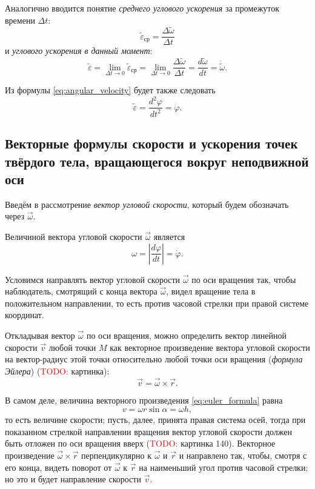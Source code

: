 \documentclass{article}
\theoremstyle{definition}
\theoremstyle{plain}
\theoremstyle{remark}
\numberwithin{equation}{section}
\newcommand{\abs}[1]{\left|#1\right|}
\newcommand{\crossprod}[2]{#1 \times #2}
\newcommand{\der}[2][]{\frac{d #1}{d #2}}
\newcommand{\sder}[2][]{\frac{d^2 #1}{d #2^2}}
\newcommand{\deltader}[2]{\frac{\Delta #1}{\Delta #2}}
\newcommand{\dt}[1][]{\der[#1]{t}}
\newcommand{\ddt}[1][]{\sder[#1]{t}}
\begin{document}
Аналогично вводится понятие \textit{среднего углового ускорения} за промежуток
времени $\Delta t$:
\begin{equation*}
  \tilde{\varepsilon}_{\text{ср}} = \deltader{\tilde{\omega}}{t}
\end{equation*}
и \textit{углового ускорения в данный момент}:
\begin{equation}
  \label{eq:angular_acceleration}
  \tilde{\varepsilon} = \lim_{\Delta t \to 0} \tilde{\varepsilon}_{\text{ср}} =
    \lim_{\Delta t \to 0} \deltader{\tilde{\omega}}{t} = \dt[\tilde{\omega}] =
    \dot{\tilde{\omega}}.
\end{equation}

Из формулы \ref{eq:angular_velocity} будет также следовать
\begin{equation*}
  \tilde{\varepsilon} = \ddt[\varphi] = \ddot{\varphi}.
\end{equation*}


\subsection{Векторные формулы скорости и ускорения точек твёрдого тела,
вращающегося вокруг неподвижной оси}

Введём в рассмотрение \textit{вектор угловой скорости}, который будем обозначать
через $\vec{\omega}$.

Величиной вектора угловой скорости $\vec{\omega}$ является
\begin{equation*}
  \omega = \abs{\dt[\varphi]} = \dot{\varphi}.
\end{equation*}

Условимся направлять вектор угловой скорости $\vec{\omega}$ по оси вращения так,
чтобы наблюдатель, смотрящий с конца вектора $\vec{\omega}$, видел вращение тела
в положительном направлении, то есть против часовой стрелки при правой системе
координат.

Откладывая вектор $\vec{\omega}$ по оси вращения, можно определить вектор
линейной скорости $\vec{v}$ любой точки $M$ как векторное произведение вектора
угловой скорости на вектор-радиус этой точки относительно любой точки оси
вращения (\textit{формула Эйлера}) (\textcolor{red}{TODO:} картинка):
\begin{equation}
  \label{eq:euler_formula}
  \vec{v} = \crossprod{\vec{\omega}}{\vec{r}}.
\end{equation}

В самом деле, величина векторного произведения \ref{eq:euler_formula} равна
\begin{equation*}
  v = \omega r \sin \alpha = \omega h,
\end{equation*}
то есть величине скорости; пусть, далее, принята правая система осей, тогда при
показанном стрелкой направлении вращения вектор угловой скорости должен быть
отложен по оси вращения вверх (\textcolor{red}{TODO:} картинка 140). Векторное
произведение $\vec{\omega} \times \vec{r}$ перпендикулярно к $\vec{\omega}$ и
$\vec{r}$ и направлено так, чтобы, смотря с его конца, видеть поворот от
$\vec{\omega}$ к $\vec{r}$ на наименьший угол против часовой стрелки; но это и
будет направление скорости $\vec{v}$.
\end{document}
